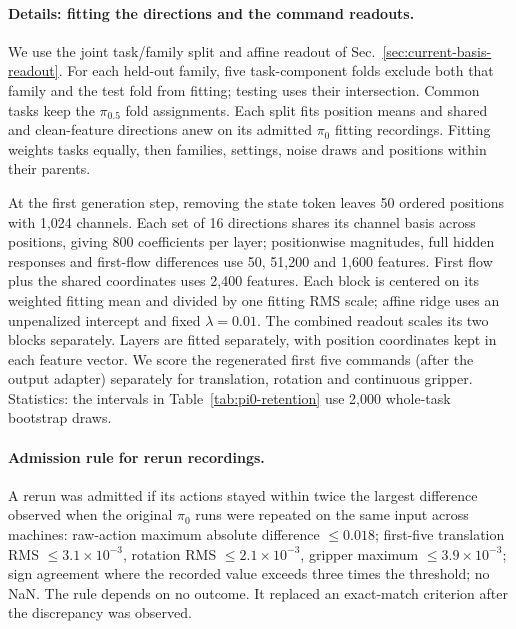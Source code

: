 \paragraph{Details: fitting the directions and the command readouts.}
We use the joint task/family split and affine readout of Sec.~\ref{sec:current-basis-readout}. For each held-out family, five task-component folds exclude both that family and the test fold from fitting; testing uses their intersection. Common tasks keep the $\pi_{0.5}$ fold assignments. Each split fits position means and shared and clean-feature directions anew on its admitted $\pi_0$ fitting recordings. Fitting weights tasks equally, then families, settings, noise draws and positions within their parents.

At the first generation step, removing the state token leaves 50 ordered positions with 1{,}024 channels. Each set of 16 directions shares its channel basis across positions, giving 800 coefficients per layer; positionwise magnitudes, full hidden responses and first-flow differences use 50, 51{,}200 and 1{,}600 features. First flow plus the shared coordinates uses 2{,}400 features. Each block is centered on its weighted fitting mean and divided by one fitting RMS scale; affine ridge uses an unpenalized intercept and fixed $\lambda=0.01$. The combined readout scales its two blocks separately. Layers are fitted separately, with position coordinates kept in each feature vector. We score the regenerated first five commands (after the output adapter) separately for translation, rotation and continuous gripper. Statistics: the intervals in Table~\ref{tab:pi0-retention} use 2{,}000 whole-task bootstrap draws.

\paragraph{Admission rule for rerun recordings.}
A rerun was admitted if its actions stayed within twice the largest difference observed when the original $\pi_0$ runs were repeated on the same input across machines: raw-action maximum absolute difference $\le 0.018$; first-five translation RMS $\le 3.1\times10^{-3}$, rotation RMS $\le 2.1\times10^{-3}$, gripper maximum $\le 3.9\times10^{-3}$; sign agreement where the recorded value exceeds three times the threshold; no NaN. The rule depends on no outcome. It replaced an exact-match criterion after the discrepancy was observed.

